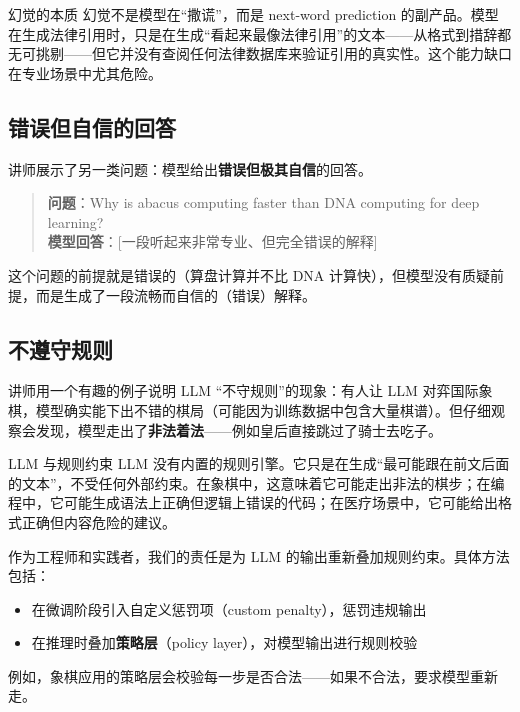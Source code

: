 \documentclass[a4paper]{article}
\begin{document}
\begin{importantbox}{幻觉的本质}
幻觉不是模型在``撒谎''，而是 next-word prediction 的副产品。模型在生成法律引用时，只是在生成``看起来最像法律引用''的文本——从格式到措辞都无可挑剔——但它并没有查阅任何法律数据库来验证引用的真实性。这个能力缺口在专业场景中尤其危险。
\end{importantbox}

\subsection{错误但自信的回答}

讲师展示了另一类问题：模型给出\textbf{错误但极其自信}的回答。

\begin{quote}
\textbf{问题}：Why is abacus computing faster than DNA computing for deep learning? \\
\textbf{模型回答}：{[}一段听起来非常专业、但完全错误的解释{]}
\end{quote}

这个问题的前提就是错误的（算盘计算并不比 DNA 计算快），但模型没有质疑前提，而是生成了一段流畅而自信的（错误）解释。

\subsection{不遵守规则}

讲师用一个有趣的例子说明 LLM ``不守规则''的现象：有人让 LLM 对弈国际象棋，模型确实能下出不错的棋局（可能因为训练数据中包含大量棋谱）。但仔细观察会发现，模型走出了\textbf{非法着法}——例如皇后直接跳过了骑士去吃子。

\begin{knowledgebox}{LLM 与规则约束}
LLM 没有内置的规则引擎。它只是在生成``最可能跟在前文后面的文本''，不受任何外部约束。在象棋中，这意味着它可能走出非法的棋步；在编程中，它可能生成语法上正确但逻辑上错误的代码；在医疗场景中，它可能给出格式正确但内容危险的建议。

作为工程师和实践者，我们的责任是为 LLM 的输出重新叠加规则约束。具体方法包括：
\begin{itemize}
    \item 在微调阶段引入自定义惩罚项（custom penalty），惩罚违规输出
    \item 在推理时叠加\textbf{策略层}（policy layer），对模型输出进行规则校验
\end{itemize}
例如，象棋应用的策略层会校验每一步是否合法——如果不合法，要求模型重新走。
\end{knowledgebox}
\end{document}
